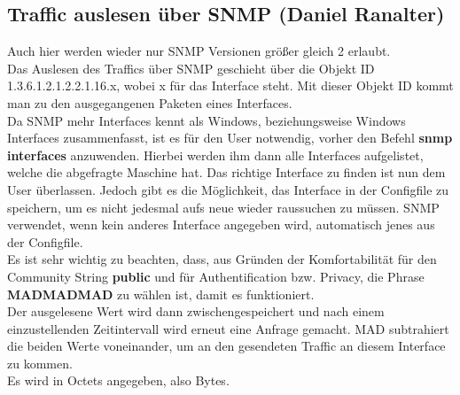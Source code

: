 \documentclass[12pt,a4paper]{report}
\begin{document}
\begin{onehalfspace}
\newpage
{}%

\subsection{Traffic auslesen über SNMP (Daniel Ranalter)}
Auch hier werden wieder nur SNMP Versionen größer gleich 2 erlaubt.\\
Das Auslesen des Traffics über SNMP geschieht über die Objekt ID 1.3.6.1.2.1.2.2.1.16.x, wobei x für das Interface steht. Mit dieser Objekt ID kommt man zu den ausgegangenen Paketen eines Interfaces.\\
Da SNMP mehr Interfaces kennt als Windows, beziehungsweise Windows Interfaces zusammenfasst, ist es für den User notwendig, vorher den Befehl \textbf{snmp interfaces} anzuwenden. Hierbei werden ihm dann alle Interfaces aufgelistet, welche die abgefragte Maschine hat. Das richtige Interface zu finden ist nun dem User überlassen. Jedoch gibt es die Möglichkeit, das Interface in der Configfile zu speichern, um es nicht jedesmal aufs neue wieder raussuchen zu müssen. SNMP verwendet, wenn kein anderes Interface angegeben wird, automatisch jenes aus der Configfile.\\
Es ist sehr wichtig zu beachten, dass, aus Gründen der Komfortabilität für den Community String \textbf{public} und für Authentification bzw. Privacy, die Phrase \textbf{MADMADMAD} zu wählen ist, damit es funktioniert.\\

Der ausgelesene Wert wird dann zwischengespeichert und nach einem einzustellenden Zeitintervall wird erneut eine Anfrage gemacht. MAD subtrahiert die beiden Werte voneinander, um an den gesendeten Traffic an diesem Interface zu kommen.\\
Es wird in Octets angegeben, also Bytes.


\end{onehalfspace}
\end{document}
